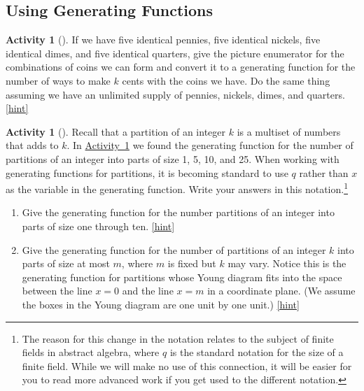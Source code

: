 \documentclass[10pt,]{book}
\theoremstyle{plain}
\theoremstyle{definition}
\theoremstyle{definition}
\theoremstyle{definition}
\newtheorem{activity}[project]{Activity}
\numberwithin{equation}{chapter}
\begin{document}
\subsection[{Using Generating Functions}]{Using Generating Functions}\label{sec_genfns-int-parts}
\begin{activity}[]\label{change-making}
\hypertarget{p-1562}{}%
If we have five identical pennies, five identical nickels, five identical dimes, and five identical quarters, give the picture enumerator for the combinations of coins we can form and convert it to a generating function for the number of ways to make \(k\) cents with the coins we have. Do the same thing assuming we have an unlimited supply of pennies, nickels, dimes, and quarters.%
\hfill{\tiny\hyperlink{a-316}{[hint]}\hypertarget{q-316}{}}\end{activity}
\begin{activity}[]\label{activity-310}
\hypertarget{p-1567}{}%
Recall that a partition of an integer \(k\) is a multiset of numbers that adds to \(k\). In \hyperref[change-making]{Activity~\ref{change-making}} we found the generating function for the number of partitions of an integer into parts of size 1, 5, 10, and 25. When working with generating functions for partitions, it is becoming standard to use \(q\) rather than \(x\) as the variable in the generating function.  Write your answers in this notation.\footnote{The reason for this change in the notation relates to the subject of finite fields in abstract algebra, where \(q\) is the standard notation for the size of a finite field.  While we will make no use of this connection, it will be easier for you to read more advanced work if you get used to the different notation.\label{fn-20}}%
\begin{enumerate}[font=\bfseries,label=(\alph*),ref=\alph*]
\item\label{task-269} \hypertarget{p-1568}{}%
Give the generating function for the number partitions of an integer into parts of size one through ten.%
\hfill{\tiny\hyperlink{a-317.a}{[hint]}\hypertarget{q-317.a}{}}\item\label{largestpartatmostm} \hypertarget{p-1571}{}%
Give the generating function for the number of partitions of an integer \(k\) into parts of size at most \(m\), where \(m\) is fixed but \(k\) may vary. Notice this is the generating function for partitions whose Young diagram fits into the space between the line \(x=0\) and the line \(x=m\) in a coordinate plane. (We assume the boxes in the Young diagram are one unit by one unit.)%
\hfill{\tiny\hyperlink{a-317.b}{[hint]}\hypertarget{q-317.b}{}}\end{enumerate}
\end{activity}
\end{document}
